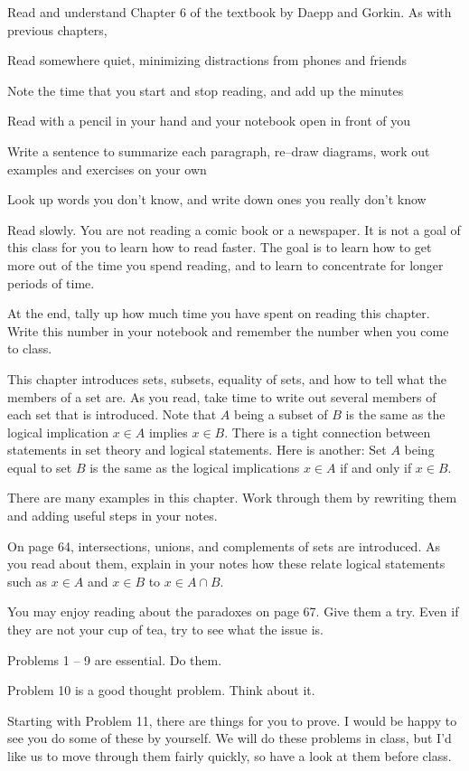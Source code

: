 
Read and understand Chapter 6 of the textbook by Daepp and Gorkin.
As with previous chapters,
{\small
\blist{0.0in}
\item Read somewhere quiet, minimizing distractions from phones and friends
\item Note the time that you start and stop reading, and add up the minutes
\item Read with a pencil in your hand and your notebook open in front of you
\item Write a sentence to summarize each paragraph, re--draw diagrams, work out examples and exercises on your own
\item Look up words you don't know, and write down ones you really don't know
\item Read slowly.  You are not reading a comic book or a newspaper.  It is not a goal of this class for you to learn how to read faster.  The goal is to learn how to get more out of the time you spend reading, and to learn to concentrate for longer periods of time.
\item At the end, tally up how much time you have spent on reading this chapter.
Write this number in your notebook and remember the number when you come to class.
\elist
}

This chapter introduces sets, subsets, equality of sets, and how to tell what the members of a set are.
As you read, take time to write out several members of each set that is introduced.
Note that $A$ being a subset of $B$ is the same as the logical implication $x \in A$ implies $x \in B$.
There is a tight connection between statements in set theory and logical statements.
Here is another:  Set $A$ being equal to set $B$ is the same as the logical implications $x \in A$ if and only if $x \in B$.

There are many examples in this chapter.
Work through them by rewriting them and adding useful steps in your notes.

On page 64, intersections, unions, and complements of sets are introduced.
As you read about them, explain in your notes how these relate logical statements such as $x \in A$ and $x \in B$ to $x \in A \cap B$.

You may enjoy reading about the paradoxes on page 67.
Give them a try.
Even if they are not your cup of tea, try to see what the issue is.

Problems 1 -- 9 are essential.  Do them.

Problem 10 is a good thought problem.  Think about it.

Starting with Problem 11, there are things for you to prove.
I would be happy to see you do some of these by yourself.
We will do these problems in class, but I'd like us to move through them fairly quickly, so have a look at them before class.

\vfill          %
